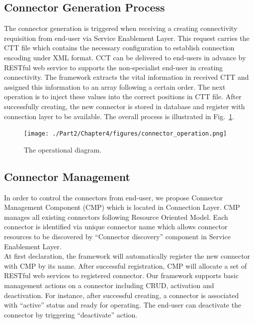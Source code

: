\subsection{Connector Generation Process}
The connector generation is triggered when receiving a creating connectivity requisition from end-user via Service Enablement Layer. This request carries the CTT file which contains the necessary configuration to establish connection encoding under XML format. CCT can be delivered to end-users in advance by RESTful web service to supports the non-specialist end-user in creating connectivity. The framework extracts the vital information in received CTT and assigned this information to an array following a certain order. The next operation is to inject these values into the correct positions in CTT file. After successfully creating, the new connector is stored in database and register with connection layer to be available. The overall process is illustrated in Fig.~\ref{fig:c4_connector_operation}.

\begin{figure}[h!] 
 \begin{center} 
 \texttt{[image: ./Part2/Chapter4/figures/connector\_operation.png]} 
    \caption{The operational diagram.}
     \label{fig:c4_connector_operation}
  \end{center} 
\end{figure}

\subsection{Connector Management}
In order to control the connectors from end-user, we propose Connector Management Component (CMP) which is located in Connection Layer. CMP manages all existing connectors following Resource Oriented Model.  Each connector is identified via unique connector name which allows connector resources to be discovered by ``Connector discovery'' component in Service Enablement Layer. \\

At first declaration, the framework will automatically register the new connector with CMP by its name. After successful registration, CMP will allocate a set of RESTful web services to registered connector. Our framework supports basic management actions on a connector including CRUD, activation and deactivation. For instance, after successful creating, a connector is associated with ``active'' status and ready for operating. The end-user can deactivate the connector by triggering ``deactivate'' action.

